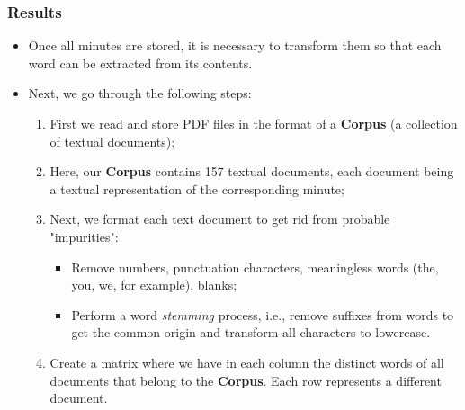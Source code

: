 \documentclass[aspectratio=169]{beamer}
\begin{document}
\begin{frame}\frametitle{Results}
  \begin{itemize}
    \item Once all minutes are stored, it is necessary to transform them so that each word can be extracted from its contents. 
    \item Next, we go through the following steps:
      \begin{enumerate}
        \item First we read and store PDF files in the format of a \textbf{Corpus} (a collection of textual documents);
        \item Here, our \textbf{Corpus} contains 157 textual documents, each document being a textual representation of the corresponding minute;
        \item Next, we format each text document to get rid from probable "impurities": 
        \begin{itemize}
          \item Remove numbers, punctuation characters, meaningless words (the, you, we, for example), blanks;
          \item Perform a word \emph{stemming} process, i.e., remove suffixes from words to get the common
          origin and transform all characters to lowercase.
        \end{itemize}
        \item Create a matrix where we have in each column the distinct words of all documents that belong to the \textbf{Corpus}. Each row represents a different document.
        \end{enumerate}
  \end{itemize}
\end{frame}
\end{document}
